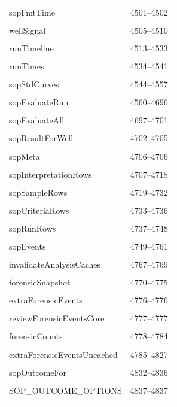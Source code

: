 {\begin{longtable}{@{}p{11cm}r@{}}
sopFmtTime & 4501--4502 \\\\\hline
wellSignal & 4505--4510 \\\\\hline
runTimeline & 4513--4533 \\\\\hline
runTimes & 4534--4541 \\\\\hline
sopStdCurves & 4544--4557 \\\\\hline
sopEvaluateRun & 4560--4696 \\\\\hline
sopEvaluateAll & 4697--4701 \\\\\hline
sopResultForWell & 4702--4705 \\\\\hline
sopMeta & 4706--4706 \\\\\hline
sopInterpretationRows & 4707--4718 \\\\\hline
sopSampleRows & 4719--4732 \\\\\hline
sopCriteriaRows & 4733--4736 \\\\\hline
sopRunRows & 4737--4748 \\\\\hline
sopEvents & 4749--4761 \\\\\hline
invalidateAnalysisCaches & 4767--4769 \\\\\hline
forensicSnapshot & 4770--4775 \\\\\hline
extraForensicEvents & 4776--4776 \\\\\hline
reviewForensicEventsCore & 4777--4777 \\\\\hline
forensicCounts & 4778--4784 \\\\\hline
extraForensicEventsUncached & 4785--4827 \\\\\hline
sopOutcomeFor & 4832--4836 \\\\\hline
SOP\_OUTCOME\_OPTIONS & 4837--4837 \\\\\hline

\end{longtable}}
